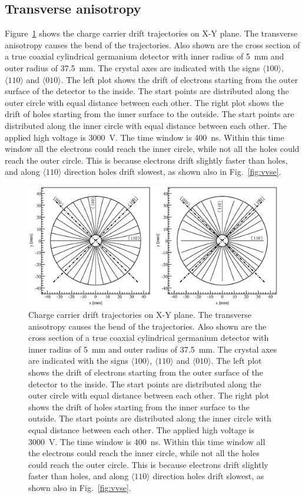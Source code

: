 \subsection{Transverse anisotropy}
\label{subsec:tran}
Figure~\ref{fig:trjs} shows the charge carrier drift trajectories on X-Y plane. The transverse anisotropy causes the bend of the trajectories. Also shown are the cross section of a true coaxial cylindrical germanium detector with inner radius of 5~mm and outer radius of 37.5~mm. The crystal axes are indicated with the signs $\langle 100 \rangle$, $\langle 110 \rangle$ and $\langle 010 \rangle$. The left plot shows the drift of electrons starting from the outer surface of the detector to the inside. The start points are distributed along the outer circle with equal distance between each other. The right plot shows the drift of holes starting from the inner surface to the outside. The start points are distributed along the inner circle with equal distance between each other. The applied high voltage is 3000~V. The time window is 400~ns. Within this time window all the electrons could reach the inner circle, while not all the holes could reach the outer circle.  This is because electrons drift slightly faster than holes, and along $\langle 110 \rangle$ direction holes drift slowest, as shown also in Fig.~\ref{fig:vvse}.
\begin{figure}[tbhp]
  \centering
  \includegraphics[width=1.0\textwidth]{trjs}
  \caption{Charge carrier drift trajectories on X-Y plane. The     transverse anisotropy causes the bend of the trajectories. Also     shown are the cross section of a true coaxial cylindrical     germanium detector with inner radius of 5~mm and outer radius of     37.5~mm. The crystal axes are indicated with the signs $\langle     100 \rangle$, $\langle 110 \rangle$ and $\langle 010 \rangle$. The     left plot shows the drift of electrons starting from the outer     surface of the detector to the inside. The start points are     distributed along the outer circle with equal distance between     each other. The right plot shows the drift of holes starting from     the inner surface to the outside. The start points are distributed     along the inner circle with equal distance between each other. The     applied high voltage is 3000~V. The time window is 400~ns. Within     this time window all the electrons could reach the inner circle,     while not all the holes could reach the outer circle. This is     because electrons drift slightly faster than holes, and along     $\langle 110 \rangle$ direction holes drift slowest, as shown also     in Fig.~\ref{fig:vvse}.}
  \label{fig:trjs}
\end{figure}


